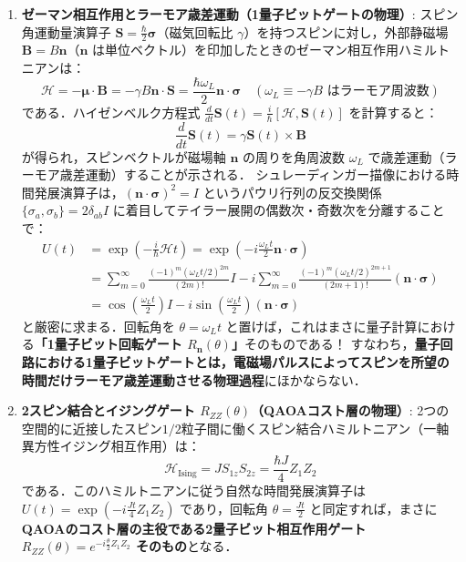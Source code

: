 \documentclass[11pt,a4paper,oneside,openany]{ltjsbook}
\theoremstyle{definition}
\theoremstyle{plain}
\theoremstyle{remark}
\begin{document}
\begin{insightbox}
\begin{enumerate}
    \item \textbf{ゼーマン相互作用とラーモア歳差運動（1量子ビットゲートの物理）}:
    スピン角運動量演算子 $\bm{S} = \frac{\hbar}{2}\bm{\sigma}$（磁気回転比 $\gamma$）を持つスピンに対し，外部静磁場 $\bm{B} = B \bm{n}$（$\bm{n}$ は単位ベクトル）を印加したときのゼーマン相互作用ハミルトニアンは：
    \begin{equation}
        \mathcal{H} = -\bm{\mu}\cdot\bm{B} = -\gamma B \bm{n}\cdot\bm{S} = \frac{\hbar \omega_L}{2} \bm{n}\cdot\bm{\sigma} \quad (\omega_L \equiv -\gamma B \text{ はラーモア周波数})
    \end{equation}
    である．ハイゼンベルク方程式 $\frac{d}{dt}\bm{S}(t) = \frac{i}{\hbar}[\mathcal{H}, \bm{S}(t)]$ を計算すると：
    \begin{equation}
        \frac{d}{dt}\bm{S}(t) = \gamma \bm{S}(t) \times \bm{B}
    \end{equation}
    が得られ，スピンベクトルが磁場軸 $\bm{n}$ の周りを角周波数 $\omega_L$ で歳差運動（ラーモア歳差運動）することが示される．
    シュレーディンガー描像における時間発展演算子は，$(\bm{n}\cdot\bm{\sigma})^2 = I$ というパウリ行列の反交換関係 $\{ \sigma_a, \sigma_b \} = 2\delta_{ab} I$ に着目してテイラー展開の偶数次・奇数次を分離することで：
    \begin{align}
        U(t) &= \exp\left(-\frac{i}{\hbar} \mathcal{H} t\right) = \exp\left(-i \frac{\omega_L t}{2} \bm{n}\cdot\bm{\sigma}\right) \nonumber \\
        &= \sum_{m=0}^\infty \frac{(-1)^m (\omega_L t / 2)^{2m}}{(2m)!} I - i \sum_{m=0}^\infty \frac{(-1)^m (\omega_L t / 2)^{2m+1}}{(2m+1)!} (\bm{n}\cdot\bm{\sigma}) \nonumber \\
        &= \cos\left(\frac{\omega_L t}{2}\right) I - i \sin\left(\frac{\omega_L t}{2}\right) (\bm{n}\cdot\bm{\sigma})
    \end{align}
    と厳密に求まる．回転角を $\theta = \omega_L t$ と置けば，これはまさに量子計算における\textbf{「1量子ビット回転ゲート $R_{\bm{n}}(\theta)$」}そのものである！
    すなわち，\textbf{量子回路における1量子ビットゲートとは，電磁場パルスによってスピンを所望の時間だけラーモア歳差運動させる物理過程}にほかならない．

    \item \textbf{2スピン結合とイジングゲート $R_{ZZ}(\theta)$（QAOAコスト層の物理）}:
    2つの空間的に近接したスピン$1/2$粒子間に働くスピン結合ハミルトニアン（一軸異方性イジング相互作用）は：
    \begin{equation}
        \mathcal{H}_{\text{Ising}} = J S_{1z} S_{2z} = \frac{\hbar J}{4} Z_1 Z_2
    \end{equation}
    である．このハミルトニアンに従う自然な時間発展演算子は $U(t) = \exp\left(-i \frac{J t}{4} Z_1 Z_2\right)$ であり，回転角 $\theta = \frac{J t}{2}$ と同定すれば，まさに\textbf{QAOAのコスト層の主役である2量子ビット相互作用ゲート $R_{ZZ}(\theta) = e^{-i \frac{\theta}{2} Z_1 Z_2}$ そのもの}となる．
\end{enumerate}
\end{insightbox}
\end{document}

